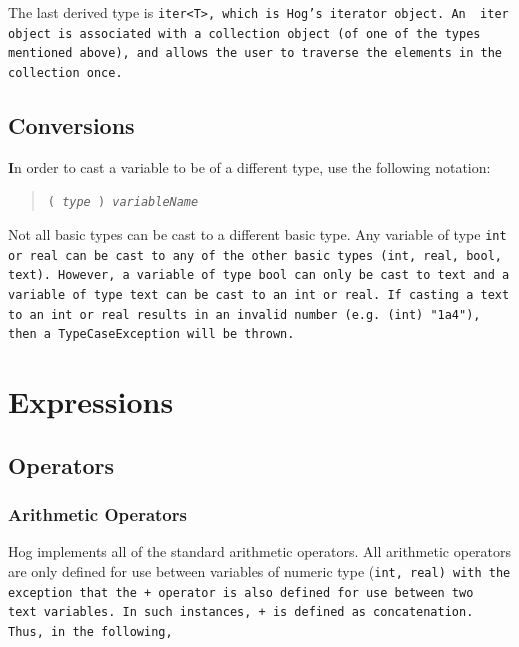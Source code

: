 \documentclass{article}
\begin{document}
The last derived type is \tt iter<T>\rm, which is Hog's iterator object. An \tt
iter \rm object is associated with a collection object (of one of the types
mentioned above), and allows the user to traverse the elements in the collection
once.


\subsection{Conversions} %
\label{sub:conversions}

\textbf In order to cast a variable to be of a different type, use the following notation:

\begin{quotation}
      \tt ( \rm \emph{type} \tt ) \rm \emph{variableName}
\end{quotation}


Not all basic types can be cast to a different basic type. Any variable of type \tt int \rm or \tt real \rm can be cast to any
of the other basic types (\tt int\rm, \tt real\rm, \tt bool\rm, \tt text\rm). However, a variable of type bool can only be cast
to \tt text \rm and a variable of type \tt text \rm can be cast to an int or real. If casting a \tt text \rm to an \tt int \rm
or \tt real \rm results in an invalid number (e.g. \tt (int) "1a4"\rm), then a \tt TypeCaseException \rm will be thrown.



\section{Expressions} %
\label{sec:expressions}

\subsection{Operators} %
\label{sub:operators}

\subsubsection{Arithmetic Operators} %
\label{ssub:arithmetic_operators}

Hog implements all of the standard arithmetic operators. All arithmetic operators are only defined for use between variables of
numeric type (\tt int\rm, \tt real\rm) with the exception that the \tt + \rm operator is also defined for use between two \tt
text \rm variables. In such instances, \tt + \rm is defined as concatenation. Thus, in the following,
\end{document}
